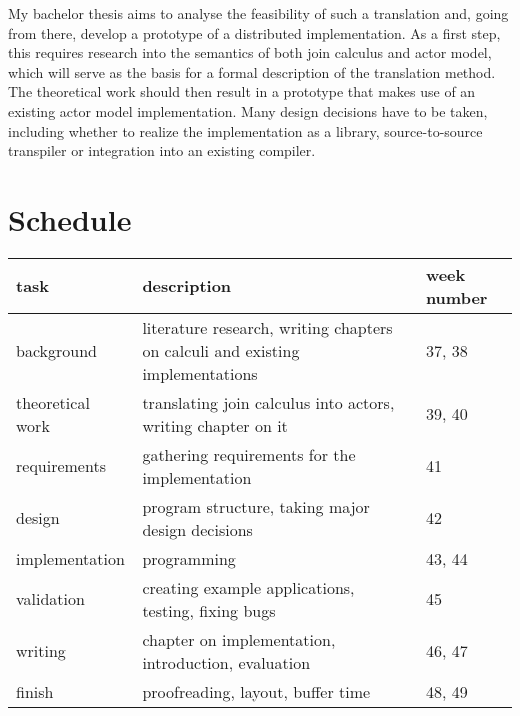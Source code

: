 \documentclass[12pt]{article}
\begin{document}
My bachelor thesis aims to analyse the feasibility of such a translation and, going from there, develop a prototype of a distributed implementation.
As a first step, this requires research into the semantics of both join calculus and actor model, which will serve as the basis for a formal description of the translation method.
The theoretical work should then result in a prototype that makes use of an existing actor model implementation.
Many design decisions have to be taken, including whether to realize the implementation as a library, source-to-source transpiler or integration into an existing compiler.


\section*{Schedule}

\begin{tabular}{| p{3cm} | p{7cm} | p{2.45cm} |}
  \hline
    task &
    description &
    week number \\
  \hline
    background &
    literature research, writing chapters on calculi and existing implementations &
    37, 38 \\
  \hline
    theoretical work &
    translating join calculus into actors, writing chapter on it &
    39, 40 \\
  \hline
    requirements &
    gathering requirements for the implementation &
    41 \\
  \hline
    design &
    program structure, taking major design decisions &
    42 \\
  \hline
    implementation &
    programming &
    43, 44 \\
  \hline
    validation &
    creating example applications, testing, fixing bugs &
    45 \\
  \hline
    writing &
    chapter on implementation, introduction, evaluation &
    46, 47 \\
  \hline
    finish &
    proofreading, layout, buffer time &
    48, 49 \\
  \hline
\end{tabular}

\nocite{levy_results_1997}
\nocite{maranget_compiling_1998}
\nocite{hewitt_viewing_1977}
\nocite{agha_actors_1986}

\pagebreak
{}

\end{document}
